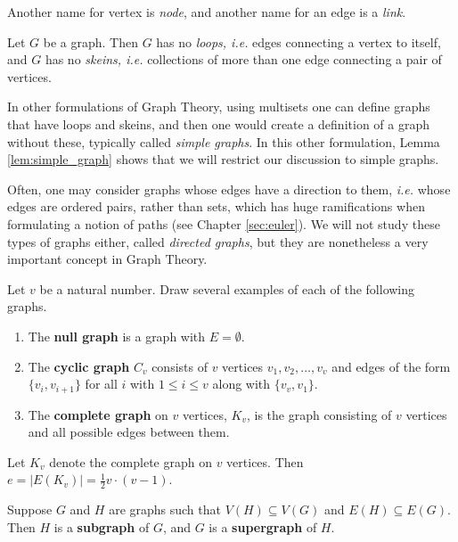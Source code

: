 Another name for vertex is \textit{node}, and another name for an edge is a \textit{link}.

\begin{lemma} \label{lem:simple_graph}Let $G$ be a graph.  Then $G$ has no \textit{loops, i.e.} edges connecting a vertex to itself, and $G$ has no \textit{skeins, i.e.} collections of more than one edge connecting a pair of vertices.
\end{lemma}

\begin{remark} In other formulations of Graph Theory, using multisets one can define graphs that have loops and skeins, and then one would create a definition of a graph without these, typically called \textit{simple graphs}.  In this other formulation, Lemma \ref{lem:simple_graph} shows that we will restrict our discussion to simple graphs.

Often, one may consider graphs whose edges have a direction to them, \textit{i.e.} whose edges are ordered pairs, rather than sets, which has huge ramifications when formulating a notion of paths (see Chapter \ref{sec:euler}).  We will not study these types of graphs either, called \textit{directed graphs}, but they are nonetheless a very important concept in Graph Theory.
\end{remark}

\begin{examples} Let $v$ be a natural number.  Draw several examples of each of the following graphs.
    \begin{enumerate}
        \item The \textbf{null graph} is a graph with $E=\emptyset$.
        \item The \textbf{cyclic graph} $C_v$ consists of $v$ vertices $v_1, v_2, \ldots, v_v$ and edges of the form $\{v_i, v_{i+1}\}$ for all $i$ with $1\leq i \leq v$ along with $\{v_v, v_1\}$.
        \item The \textbf{complete graph} on $v$ vertices, $K_v$, is the graph consisting of $v$ vertices and all possible edges between them.
    \end{enumerate}
\end{examples}

\begin{theorem} \label{thm:edges_in_Kv} Let $K_v$ denote the complete graph on $v$ vertices.  Then $e=|E(K_v)|= \frac{1}{2} v \cdot (v-1)$.
\end{theorem}

\begin{definition}
    Suppose $G$ and $H$ are graphs such that $V(H) \subseteq V(G)$ and $E(H) \subseteq E(G)$.  Then $H$ is a \textbf{subgraph} of $G$, and $G$ is a \textbf{supergraph} of $H$.
\end{definition}

